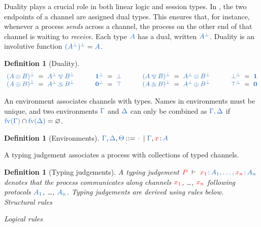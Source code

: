 \documentclass[submission,copyright,creativecommons]{eptcs}
\def\Coloneqq{\mathbin{::=}}
\newtheorem{definition}[lemma]{Definition}
\begin{document}
Duality plays a crucial role in both linear logic and session types. In \cp, the two endpoints of a channel are assigned dual types. This ensures that, for instance, whenever a process \emph{sends} across a channel, the process on the other end of that channel is waiting to \emph{receive}. Each type $\ty{A}$ has a dual, written $\ty{A^\bot}$. Duality is an involutive function \ie $\ty{(A^\bot)^\bot} = \ty{A}$.
\begin{definition}[Duality]\label{def:cp-negation}
  \[
    \setlength{\arraycolsep}{3pt}
    \begin{array}{lclclclclclclcl}
               \ty{(A \tens B)^\bot} & = & \ty{A^\bot \parr B^\bot}
      &\qquad& \ty{\one^\bot}        & = & \ty{\bot}
      &\qquad& \ty{(A \parr B)^\bot} & = & \ty{A^\bot \tens B^\bot}
      &\qquad& \ty{\bot^\bot}        & = & \ty{\one}
      \\       \ty{(A \plus B)^\bot} & = & \ty{A^\bot \with B^\bot}
      &\qquad& \ty{\nil^\bot}        & = & \ty{\top}
      &\qquad& \ty{(A \with B)^\bot} & = & \ty{A^\bot \plus B^\bot}
      &\qquad& \ty{\top^\bot}        & = & \ty{\nil}
    \end{array}
  \]
\end{definition}\noindent
An environment associates channels with types. Names in environments must be unique, and two environments $\ty{\Gamma}$ and $\ty{\Delta}$ can only be combined as $\ty{\Gamma, \Delta}$ if $\ty{\fv{\Gamma}} \cap \ty{\fv{\Delta}} = \varnothing$.
\begin{definition}[Environments]\label{def:cp-environments}
  \(
    \ty{\Gamma}, \ty{\Delta}, \ty{\Theta} \Coloneqq \ty{\emptycontext} \mid \ty{\Gamma}, \tmty{x}{A}
  \)
\end{definition}\noindent
A typing judgement associates a process with collections of typed channels.
\begin{definition}[Typing judgements]\label{def:cp}
  A typing judgement $\seq[{ P }]{\tmty{x_1}{A_1}, \dots, \tmty{x_n}{A_n}}$
  denotes that the process  communicates along channels $\tm{x_1}$, \dots,
  $\tm{x_n}$ following protocols $\ty{A_1}$, \dots, $\ty{A_n}$. Typing
  judgements are derived using rules below.
  \\[1\baselineskip]
  {Structural rules}
  \begin{center}
    \cpInfAx \cpInfCut
  \end{center}
	{Logical rules}
  \begin{center}
    \cpInfTens \cpInfParr
  \end{center}
  \begin{center}
    \cpInfBot
    \cpInfOne
  \end{center}
  \begin{center}
  \end{center}
  \begin{center}
    \cpInfWith
  \end{center}
  \begin{center}
    \cpInfNil
    \cpInfTop   
  \end{center}
\end{definition}
\end{document}
